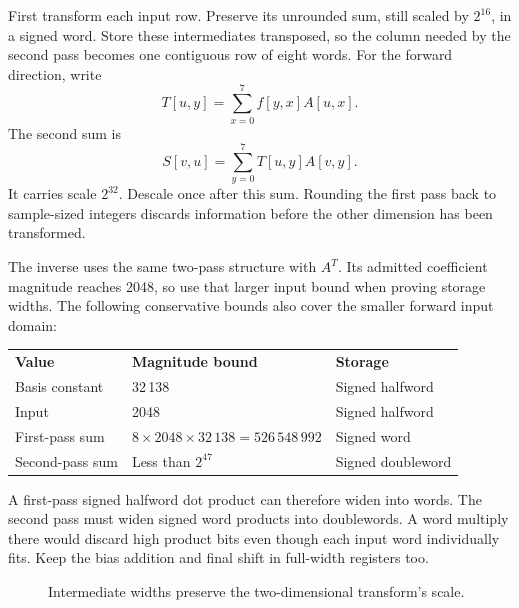 First transform each input row. Preserve its unrounded sum, still scaled by
$2^{16}$, in a signed word. Store these intermediates transposed, so the column
needed by the second pass becomes one contiguous row of eight words. For the
forward direction, write
\[
  T[u,y]=\sum_{x=0}^{7}f[y,x]A[u,x].
\]
The second sum is
\[
  S[v,u]=\sum_{y=0}^{7}T[u,y]A[v,y].
\]
It carries scale $2^{32}$. Descale once after this sum. Rounding the first pass
back to sample-sized integers discards information before the other dimension
has been transformed.

The inverse uses the same two-pass structure with $A^T$. Its admitted coefficient
magnitude reaches 2048, so use that larger input bound when proving storage widths.
The following conservative bounds also cover the smaller forward input domain:
\begin{center}
  \begin{tabular}{lll}
    \textbf{Value}  & \textbf{Magnitude bound}                 & \textbf{Storage}  \\
    Basis constant  & 32\,138                                  & Signed halfword   \\
    Input           & 2048                                     & Signed halfword   \\
    First-pass sum  & $8\times2048\times32\,138=526\,548\,992$ & Signed word       \\
    Second-pass sum & Less than $2^{47}$                       & Signed doubleword
  \end{tabular}
\end{center}
A first-pass signed halfword dot product can therefore widen into words.
The second pass must widen signed word products into doublewords. A word multiply
there would discard high product bits even though each input word individually
fits. Keep the bias addition and final shift in full-width registers too.

\begin{figure}[htbp]
  \centering
  \caption{Intermediate widths preserve the two-dimensional transform's scale.}
\end{figure}

